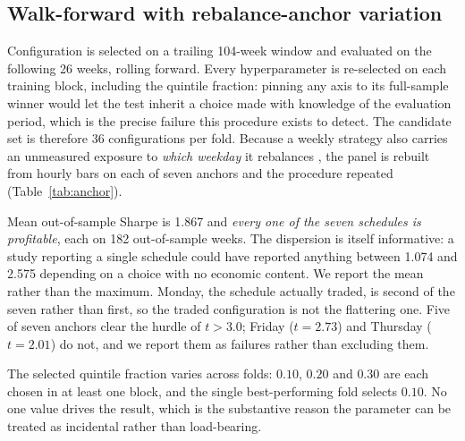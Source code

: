 \documentclass[11pt,letterpaper]{article}
\begin{document}
\subsection{Walk-forward with rebalance-anchor variation}

Configuration is selected on a trailing 104-week window and evaluated on the
following 26 weeks, rolling forward. Every hyperparameter is re-selected on each
training block, including the quintile fraction: pinning any axis to its
full-sample winner would let the test inherit a choice made with knowledge of the
evaluation period, which is the precise failure this procedure exists to detect.
The candidate set is therefore 36 configurations per fold. Because a weekly
strategy also carries an unmeasured exposure to \emph{which weekday} it
rebalances \citep{hoffstein2019}, the panel is rebuilt from hourly bars on each of
seven anchors and the procedure repeated (Table~\ref{tab:anchor}).

Mean out-of-sample Sharpe is 1.867 and \emph{every one of the seven schedules is
profitable}, each on 182 out-of-sample weeks. The dispersion is itself
informative: a study reporting a single schedule could have reported anything
between 1.074 and 2.575 depending on a choice with no economic content. We report
the mean rather than the maximum. Monday, the schedule actually traded, is second
of the seven rather than first, so the traded configuration is not the flattering
one. Five of seven anchors clear the \citet{harvey2016} hurdle of $t>3.0$;
Friday ($t=2.73$) and Thursday ($t=2.01$) do not, and we report them as failures
rather than excluding them.

The selected quintile fraction varies across folds: $0.10$, $0.20$ and $0.30$
are each chosen in at least one block, and the single best-performing fold
selects $0.10$. No one value drives the result, which is the substantive reason
the parameter can be treated as incidental rather than load-bearing.
\end{document}
